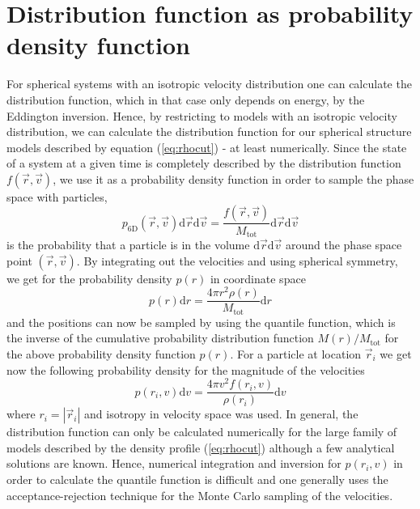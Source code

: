 \documentclass[a4paper,10pt]{article}
\newcommand{\Mtot}{M_{\mathrm{tot}}}
\begin{document}
\section{Distribution function as probability density function}

For spherical systems with an isotropic velocity distribution one can calculate the distribution function, which in that case only depends on energy, by the Eddington inversion. Hence, by restricting to models with an isotropic velocity distribution, we can calculate the distribution function for our spherical structure models described by equation (\ref{eq:rhocut}) - at least numerically. Since the state of a system at a given time is completely described by the distribution function $f(\vec{r},\vec{v})$, we use it as a probability density function in order to sample the phase space with particles,
\begin{equation}
p_{\mathrm{6D}}(\vec{r},\vec{v}) \mathrm{d}\vec{r} \mathrm{d}\vec{v} = \frac{f(\vec{r},\vec{v})}{\Mtot} \mathrm{d}\vec{r} \mathrm{d}\vec{v}
\end{equation}  
is the probability that a particle is in the volume $\mathrm{d}\vec{r} \mathrm{d}\vec{v}$ around the phase space point $(\vec{r},\vec{v})$. By integrating out the velocities and using spherical symmetry, we get for the probability density $p(r)$ in coordinate space
\begin{equation}
p(r) \mathrm{d}r = \frac{4 \pi r^2 \rho(r)}{\Mtot} \mathrm{d}r
\end{equation}
and the positions can now be sampled by using the quantile function, which is the inverse of the cumulative probability distribution function $M(r)/\Mtot$ for the above probability density function $p(r)$. For a particle at location $\vec{r}_i$ we get now the following probability density for the magnitude of the velocities
\begin{equation}
p(r_i,v) \mathrm{d}v = \frac{4 \pi v^2 f(r_i,v)}{\rho(r_i)} \mathrm{d}v
\end{equation}
where $r_i = |\vec{r}_i|$ and isotropy in velocity space was used. In general, the distribution function can only be calculated numerically for the large family of models described by the density profile (\ref{eq:rhocut}) although a few analytical solutions are known. Hence, numerical integration and inversion for $p(r_i,v)$ in order to calculate the quantile function is difficult and one generally uses the acceptance-rejection technique for the Monte Carlo sampling of the velocities.
\end{document}
